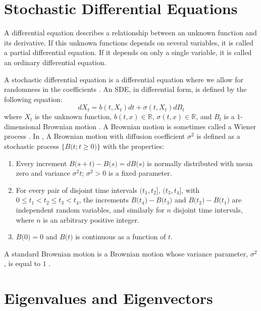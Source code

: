 
\section{Stochastic Differential Equations}

\noindent A differential equation describes a relationship between an unknown function and its derivative. If this unknown functions depends on several variables, it is called a partial differential equation. If it depends on only a single variable, it is called an ordinary differential equation. \cite[p.~1]{diff_eq_book}

A stochastic differential equation is a differential equation where we allow for randomness in the coefficients \cite[p.~2]{stoch_diff_eq_book}. An SDE, in differential form, is defined by the following equation: \begin{equation}
    dX_t = b(t,X_t) dt + \sigma(t, X_t) dB_t
\end{equation} where $X_t$ is the unknown function, $b(t,x) \in \mathbb{R}$, $\sigma (t,x) \in \mathbb{R}$, and $B_t$ is a $1$-dimensional Brownian motion \cite[p.~65]{stoch_diff_eq_book}. A Brownian motion is sometimes called a Wiener process \cite[p.~392]{intro_stoch_mod}. In \cite[p.~394]{intro_stoch_mod}, A Brownian motion with diffusion coefficient $\sigma^2$ is defined as a stochastic process $\bigl\{ B \bigl( t ; t \geq 0 \bigr) \bigr\}$ with the properties: \begin{enumerate}[label=(\alph*)]
\item Every increment $B \bigl( s + t \bigr) - B \bigl( s \bigr) = d B \bigl( s \bigr)$ is normally distributed with mean zero and variance $\sigma^2 t$; $\sigma^2 > 0$ is a fixed parameter.
\item For every pair of disjoint time intervals $\bigl( t_1, t_2 \bigr]$, $\bigl( t_3, t_4 \bigr]$, with $0 \leq t_1 < t_2 \leq t_3 < t_4$, the increments $B \bigl( t_4 \bigr) - B \bigl( t_3 \bigr)$ and $B \bigl( t_2 \bigr) - B \bigl( t_1 \bigr)$ are independent random variables, and similarly for $n$ disjoint time intervals, where $n$ is an arbitrary positive integer.
\item $B \bigl( 0 \bigr) = 0$ and $B \bigl( t \bigr)$ is continuous as a function of $t$.
\end{enumerate} A standard Brownian motion is a Brownian motion whose variance parameter, $\sigma^2$, is equal to $1$ \cite[p.~394]{intro_stoch_mod}.

\newpage

\section{Eigenvalues and Eigenvectors}

